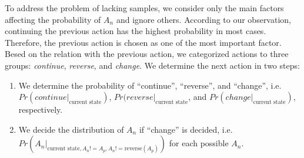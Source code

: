 To address the problem of lacking samples, we consider only the main factors 
affecting the probability of $A_n$ and ignore others. 
According to our observation, 
continuing the previous action has the highest probability in most cases. 
Therefore, the previous action is chosen as one of the most important factor. 
Besed on the relation with the previous action, we categorized actions to three groups: 
\textit{continue}, \textit{reverse}, and \textit{change}. 
We determine the next action in two steps:
\begin{enumerate}
    \item We determine the probability of ``continue'', ``reverse'', and ``change'',
        i.e. $Pr(continue|_{\textrm{current state}})$, 
        $Pr(reverse|_{\textrm{current state}}$, 
        and $Pr(change|_{\textrm{current state}})$,
        respectively. 
    \item We decide the distribution of $A_n$ if ``change'' is decided, 
        i.e. $Pr(A_n |_{\textrm{current state}, A_n != A_p, A_n != \textrm{reverse}(A_p)})$ 
        for each possible $A_n$. 
\end{enumerate}




